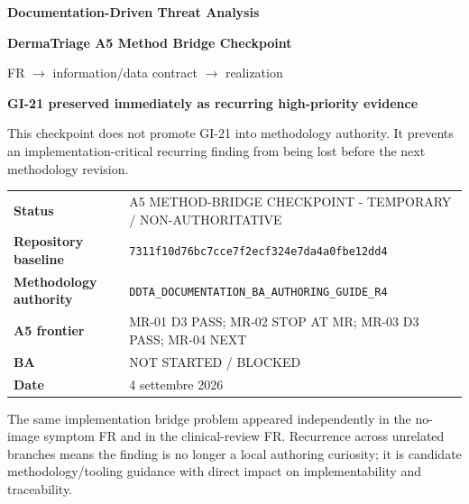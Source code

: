 \documentclass[11pt,a4paper]{article}
\begin{document}
\begin{titlepage}\thispagestyle{empty}\vspace*{8mm}
{\sffamily\bfseries\color{DDTANavy}\fontsize{15}{18}\selectfont Documentation-Driven Threat Analysis}\par\vspace{5mm}
{\sffamily\bfseries\color{DDTANavy}\fontsize{27}{31}\selectfont DermaTriage A5 Method Bridge Checkpoint}\par\vspace{2mm}
{\sffamily\color{DDTABlue}\fontsize{17}{21}\selectfont FR $\rightarrow$ information/data contract $\rightarrow$ realization}\par
\vspace{10mm}
\begin{tcolorbox}[enhanced,arc=3pt,boxrule=0pt,colback=DDTANavy,left=12pt,right=12pt,top=11pt,bottom=11pt]
{\color{white}\sffamily\bfseries\large GI-21 preserved immediately as recurring high-priority evidence}\par\vspace{2mm}
{\color{white!88}\small This checkpoint does not promote GI-21 into methodology authority. It prevents an implementation-critical recurring finding from being lost before the next methodology revision.}
\end{tcolorbox}
\vspace{8mm}
\begin{tabularx}{\textwidth}{L{43mm}Y}\toprule
\textbf{Status} & A5 METHOD-BRIDGE CHECKPOINT - TEMPORARY / NON-AUTHORITATIVE \\
\textbf{Repository baseline} & \texttt{7311f10d76bc7cce7f2ecf324e7da4a0fbe12dd4} \\
\textbf{Methodology authority} & \texttt{DDTA\_DOCUMENTATION\_BA\_AUTHORING\_GUIDE\_R4} \\
\textbf{A5 frontier} & MR-01 D3 PASS; MR-02 STOP AT MR; MR-03 D3 PASS; MR-04 NEXT \\
\textbf{BA} & NOT STARTED / BLOCKED \\
\textbf{Date} & 4 settembre 2026 \\
\bottomrule\end{tabularx}
\vfill
\begin{ddtaprinciple}[title={Why checkpoint now}]
The same implementation bridge problem appeared independently in the no-image symptom FR and in the clinical-review FR. Recurrence across unrelated branches means the finding is no longer a local authoring curiosity; it is candidate methodology/tooling guidance with direct impact on implementability and traceability.
\end{ddtaprinciple}
\end{titlepage}
\tableofcontents\clearpage
\end{document}
